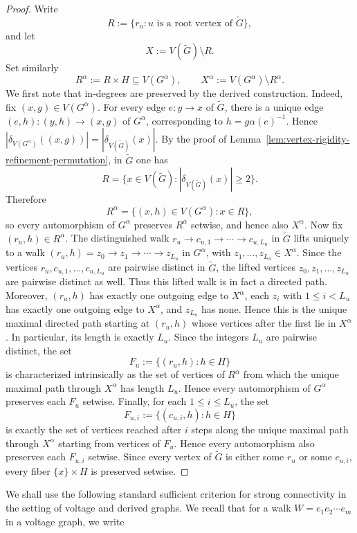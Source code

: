 \documentclass[a4paper,10pt]{amsart}
\theoremstyle{plain}
\theoremstyle{definition}
\begin{document}
\begin{proof}
Write
\[
R:=\{r_u: u \text{ is a root vertex of }\widetilde G\},
\]
and let
\[
X:=V(\widetilde G)\setminus R.
\]
Set similarly
\[
R^\alpha:=R\times H\subseteq V(G^\alpha),
\qquad
X^\alpha:=V(G^\alpha)\setminus R^\alpha.
\]
We first note that in-degrees are preserved by the derived construction. Indeed, fix $(x,g)\in V(G^\alpha)$. For every edge $e:y\to x$ of $\widetilde G$, there is a unique edge $(e,h):(y,h)\to (x,g)$ of $G^\alpha$, corresponding to $h=g\alpha(e)^{-1}$. Hence $|\delta_{V(G^\alpha)}((x,g))|=|\delta_{V(\widetilde G)}(x)|.$ By the proof of Lemma~\ref{lem:vertex-rigidity-refinement-permutation}, in $\widetilde G$ one has
\[
R=\{x\in V(\widetilde G): |\delta_{V(\widetilde G)}(x)|\ge 2\}.
\]
Therefore
\[
R^\alpha=\{(x,h)\in V(G^\alpha): x\in R\},
\]
so every automorphism of $G^\alpha$ preserves $R^\alpha$ setwise, and hence also $X^\alpha$. Now fix $(r_u,h)\in R^\alpha$. The distinguished walk
$r_u\to c_{u,1}\to \cdots \to c_{u,L_u}$ in $\widetilde G$ lifts uniquely to a walk $(r_u,h)=z_0\to z_1\to \cdots \to z_{L_u}$ in $G^\alpha$, with $z_1,\dots,z_{L_u}\in X^\alpha$. Since the vertices $r_u,c_{u,1},\dots,c_{u,L_u}$
are pairwise distinct in $\widetilde G$, the lifted vertices $z_0,z_1,\dots,z_{L_u}$ are pairwise distinct as well. Thus this lifted walk is in fact a directed path.
Moreover, $(r_u,h)$ has exactly one outgoing edge to $X^\alpha$, each $z_i$ with $1\le i<L_u$ has exactly one outgoing edge to $X^\alpha$, and $z_{L_u}$ has none. Hence this is the unique maximal directed path starting at $(r_u,h)$ whose vertices after the first lie in $X^\alpha$. In particular, its length is exactly $L_u$. Since the integers $L_u$ are pairwise distinct, the set
\[
F_u:=\{(r_u,h): h\in H\}
\]
is characterized intrinsically as the set of vertices of $R^\alpha$ from which the unique maximal path through $X^\alpha$ has length $L_u$. Hence every automorphism of $G^\alpha$ preserves each $F_u$ setwise. Finally, for each $1\le i\le L_u$, the set
\[
F_{u,i}:=\{(c_{u,i},h): h\in H\}
\]
is exactly the set of vertices reached after $i$ steps along the unique maximal path through $X^\alpha$ starting from vertices of $F_u$. Hence every automorphism also preserves each $F_{u,i}$ setwise. Since every vertex of $\widetilde G$ is either some $r_u$ or some $c_{u,i}$, every fiber $\{x\}\times H$ is preserved setwise.
\end{proof}
We shall use the following standard sufficient criterion for strong connectivity in the setting of voltage and derived graphs. We recall that for a walk $W=e_1e_2\cdots e_m$ in a voltage graph, we write
\end{document}
